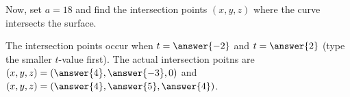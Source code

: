 \documentclass{ximera}
\begin{document}
\begin{exercise}
\begin{exercise}
\begin{exercise}
Now, set $a=18$ and find the intersection points $(x,y,z)$ where the curve intersects the surface.

The intersection points occur when $t=\answer{-2}$ and $t=\answer{2}$ (type the smaller $t$-value first).  The actual intersection poitns are $(x,y,z) = \left(\answer{4},\answer{-3}, 0  \right)$ and $(x,y,z) = \left(\answer{4},\answer{5}, \answer{4}  \right)$.
\end{exercise}
\end{exercise}
\end{exercise}
\end{document}
